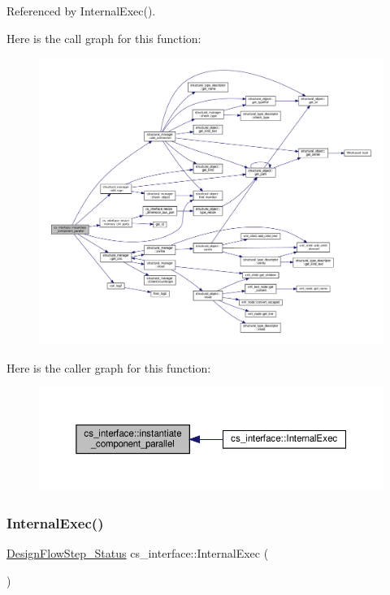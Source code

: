Referenced by Internal\+Exec().

Here is the call graph for this function\+:
\nopagebreak
\begin{figure}[H]
\begin{center}
\leavevmode
\includegraphics[width=350pt]{d1/dfa/classcs__interface_a2c5cacb106ce0e000f1a7fe2f5caf5a8_cgraph}
\end{center}
\end{figure}
Here is the caller graph for this function\+:
\nopagebreak
\begin{figure}[H]
\begin{center}
\leavevmode
\includegraphics[width=350pt]{d1/dfa/classcs__interface_a2c5cacb106ce0e000f1a7fe2f5caf5a8_icgraph}
\end{center}
\end{figure}
\mbox{\label{classcs__interface_aee8a7879cdc7e9591c5c7bce22c3d1a7}} 
\subsubsection{\texorpdfstring{Internal\+Exec()}{InternalExec()}}
{\footnotesize\ttfamily \hyperlink{design__flow__step_8hpp_afb1f0d73069c26076b8d31dbc8ebecdf}{Design\+Flow\+Step\+\_\+\+Status} cs\+\_\+interface\+::\+Internal\+Exec (\begin{DoxyParamCaption}{ }\end{DoxyParamCaption})\hspace{0.3cm}{\ttfamily [virtual]}}



